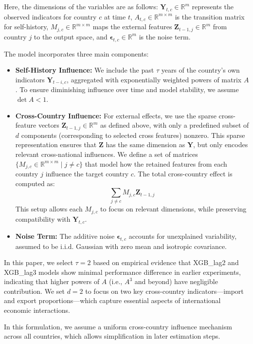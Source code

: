\documentclass[12pt]{article}
\begin{document}
Here, the dimensions of the variables are as follows: 
$\mathbf{Y}_{t,c} \in \mathbb{R}^m$ represents the observed indicators for country $c$ at time $t$, 
$A_{t,c} \in \mathbb{R}^{m \times m}$ is the transition matrix for self-history, 
$M_{j,c} \in \mathbb{R}^{m \times m}$ maps the external features $\mathbf{Z}_{t-1,j} \in \mathbb{R}^m$ from country $j$ to the output space, 
and $\boldsymbol{\epsilon}_{t,c} \in \mathbb{R}^m$ is the noise term.

The model incorporates three main components:
\begin{itemize}
  \item \textbf{Self-History Influence:} We include the past $\tau$ years of the country's own indicators $\mathbf{Y}_{t-i,c}$, aggregated with exponentially weighted powers of matrix $A$. To ensure diminishing influence over time and model stability, we assume $\det A < 1$.
  \item \textbf{Cross-Country Influence:} For external effects, we use the sparse cross-feature vectors $\mathbf{Z}_{t-1,j} \in \mathbb{R}^m$ as defined above, with only a predefined subset of $d$ components (corresponding to selected cross features) nonzero. This sparse representation ensures that $\mathbf{Z}$ has the same dimension as $\mathbf{Y}$, but only encodes relevant cross-national influences. We define a set of matrices $\{M_{j,c} \in \mathbb{R}^{m \times m} \mid j \neq c\}$ that model how the retained features from each country $j$ influence the target country $c$. The total cross-country effect is computed as:
  \[
  \sum_{j \neq c} M_{j,c} \mathbf{Z}_{t-1,j}
  \]
  This setup allows each $M_{j,c}$ to focus on relevant dimensions, while preserving compatibility with $\mathbf{Y}_{t,c}$.
  \item \textbf{Noise Term:} The additive noise $\boldsymbol{\epsilon}_{t,c}$ accounts for unexplained variability, assumed to be i.i.d. Gaussian with zero mean and isotropic covariance.
\end{itemize}

In this paper, we select $\tau = 2$ based on empirical evidence that XGB\_lag2 and XGB\_lag3 models show minimal performance difference in earlier experiments, indicating that higher powers of $A$ (i.e., $A^3$ and beyond) have negligible contribution. We set $d = 2$ to focus on two key cross-country indicators—import and export proportions—which capture essential aspects of international economic interactions.


In this formulation, we assume a uniform cross-country influence mechanism across all countries, which allows simplification in later estimation steps.
\end{document}
